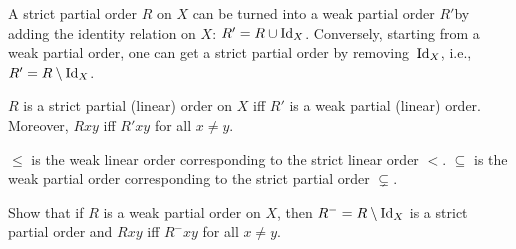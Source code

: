 \documentclass[../../../include/open-logic-section]{subfiles}
\begin{document}
A strict partial order $R$ on $X$ can be turned into a weak partial
order $R'$by adding the identity relation on $X$: $R' = R \cup \mathord{\mathrm{Id}_{X}}$.
Conversely, starting from a weak partial order, one can get a strict
partial order by removing~$\mathord{\mathrm{Id}_{X}}$, i.e., $R' = R \setminus \mathord{\mathrm{Id}_{X}}$.

\begin{prop}
$R$ is a strict partial (linear) order on $X$ iff $R'$ is a weak
  partial (linear) order. Moreover, $Rxy$ iff $R'xy$ for all $x \neq
  y$.
\end{prop}

\begin{ex}
$\le$ is the weak linear order corresponding to the strict linear
  order $<$. $\subseteq$ is the weak partial order corresponding to the
  strict partial order $\subsetneq$.
\end{ex}

\begin{prob}
Show that if $R$ is a weak partial order on $X$, then
$R^{-}=R \setminus \mathord{\mathrm{Id}_{X}}$ is a strict partial order and $Rxy$ iff
$R^{-}xy$ for all $x \neq y$.
\end{prob}
\end{document}
